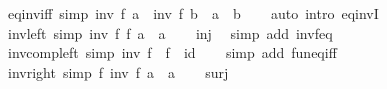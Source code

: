 \begin{isabellebody}
\endisatagproof
{\isafoldproof}%
%
\isadelimproof
\isanewline
%
\endisadelimproof
\isanewline
{}\isamarkupfalse%
\ eq{\isacharunderscore}{\kern0pt}inv{\isacharunderscore}{\kern0pt}iff\ {\isacharbrackleft}{\kern0pt}simp{\isacharbrackright}{\kern0pt}{\isacharcolon}{\kern0pt}\ {\isachardoublequoteopen}inv\ f\ a\ {\isacharequal}{\kern0pt}\ inv\ f\ b\ {\isasymlongleftrightarrow}\ a\ {\isacharequal}{\kern0pt}\ b{\isachardoublequoteclose}\isanewline
%
\isadelimproof
\ \ %
\endisadelimproof
%
\isatagproof
{}\isamarkupfalse%
\ {\isacharparenleft}{\kern0pt}auto\ intro{\isacharcolon}{\kern0pt}\ eq{\isacharunderscore}{\kern0pt}invI{\isacharparenright}{\kern0pt}%
\endisatagproof
{\isafoldproof}%
%
\isadelimproof
\isanewline
%
\endisadelimproof
\isanewline
{}\isamarkupfalse%
\ inv{\isacharunderscore}{\kern0pt}left\ {\isacharbrackleft}{\kern0pt}simp{\isacharbrackright}{\kern0pt}{\isacharcolon}{\kern0pt}\ {\isachardoublequoteopen}inv\ f\ {\isacharparenleft}{\kern0pt}f\ a{\isacharparenright}{\kern0pt}\ {\isacharequal}{\kern0pt}\ a{\isachardoublequoteclose}\isanewline
%
\isadelimproof
\ \ %
\endisadelimproof
%
\isatagproof
{}\isamarkupfalse%
\ inj\ \isamarkupfalse%
\ {\isacharparenleft}{\kern0pt}simp\ add{\isacharcolon}{\kern0pt}\ inv{\isacharunderscore}{\kern0pt}f{\isacharunderscore}{\kern0pt}eq{\isacharparenright}{\kern0pt}%
\endisatagproof
{\isafoldproof}%
%
\isadelimproof
\isanewline
%
\endisadelimproof
\isanewline
{}\isamarkupfalse%
\ inv{\isacharunderscore}{\kern0pt}comp{\isacharunderscore}{\kern0pt}left\ {\isacharbrackleft}{\kern0pt}simp{\isacharbrackright}{\kern0pt}{\isacharcolon}{\kern0pt}\ {\isachardoublequoteopen}inv\ f\ {\isasymcirc}\ f\ {\isacharequal}{\kern0pt}\ id{\isachardoublequoteclose}\isanewline
%
\isadelimproof
\ \ %
\endisadelimproof
%
\isatagproof
{}\isamarkupfalse%
\ {\isacharparenleft}{\kern0pt}simp\ add{\isacharcolon}{\kern0pt}\ fun{\isacharunderscore}{\kern0pt}eq{\isacharunderscore}{\kern0pt}iff{\isacharparenright}{\kern0pt}%
\endisatagproof
{\isafoldproof}%
%
\isadelimproof
\isanewline
%
\endisadelimproof
\isanewline
{}\isamarkupfalse%
\ inv{\isacharunderscore}{\kern0pt}right\ {\isacharbrackleft}{\kern0pt}simp{\isacharbrackright}{\kern0pt}{\isacharcolon}{\kern0pt}\ {\isachardoublequoteopen}f\ {\isacharparenleft}{\kern0pt}inv\ f\ a{\isacharparenright}{\kern0pt}\ {\isacharequal}{\kern0pt}\ a{\isachardoublequoteclose}\isanewline
%
\isadelimproof
\ \ %
\endisadelimproof
%
\isatagproof
{}\isamarkupfalse%
\ surj\ \isamarkupfalse%

\end{isabellebody}
